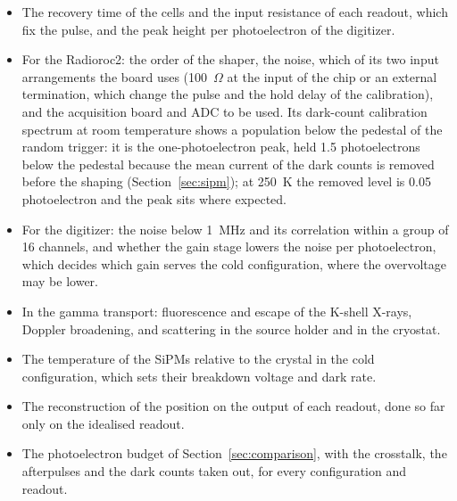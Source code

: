 \documentclass[11pt]{article}
\begin{document}
\begin{itemize}
  modelled, which waits for the bench measurements.
\item The recovery time of the cells and the input resistance of each
  readout, which fix the pulse, and the peak height per photoelectron of
  the digitizer.
\item For the Radioroc2: the order of the shaper, the noise, which of its
  two input arrangements the board uses (100~$\Omega$ at the input of the
  chip or an external termination, which change the pulse and the hold
  delay of the calibration), and the acquisition board and ADC to be used.
  Its dark-count calibration spectrum at room temperature shows a
  population below the pedestal of the random trigger: it is the
  one-photoelectron peak, held 1.5 photoelectrons below the pedestal
  because the mean current of the dark counts is removed before the
  shaping (Section~\ref{sec:sipm}); at 250~K the removed level is 0.05
  photoelectron and the peak sits where expected.
\item For the digitizer: the noise below 1~MHz and its correlation within
  a group of 16 channels, and whether the gain stage lowers the noise per
  photoelectron, which decides which gain serves the cold configuration,
  where the overvoltage may be lower.
\item In the gamma transport: fluorescence and escape of the K-shell X-rays,
  Doppler broadening, and scattering in the source holder and in the
  cryostat.
\item The temperature of the SiPMs relative to the crystal in the cold
  configuration, which sets their breakdown voltage and dark rate.
\item The reconstruction of the position on the output of each readout,
  done so far only on the idealised readout.
\item The photoelectron budget of Section~\ref{sec:comparison}, with the
  crosstalk, the afterpulses and the dark counts taken out, for every
  configuration and readout.
\end{itemize}
\end{document}
